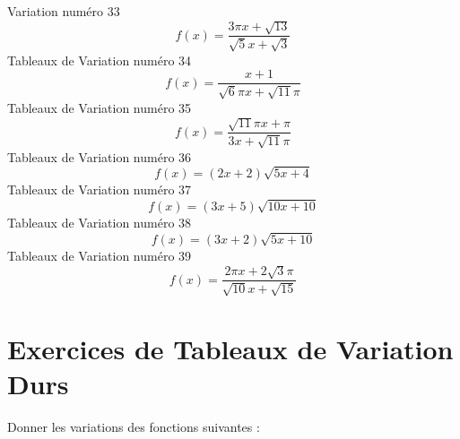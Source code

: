 \documentclass{article}
\begin{document}
Variation num\'ero 33 \[f(x) = \frac{3 \pi x + \sqrt{13}}{\sqrt{5} x + \sqrt{3}}\]Tableaux de Variation num\'ero 34 \[f(x) = \frac{x + 1}{\sqrt{6} \pi x + \sqrt{11} \pi}\]Tableaux de Variation num\'ero 35 \[f(x) = \frac{\sqrt{11} \pi x + \pi}{3 x + \sqrt{11} \pi}\]Tableaux de Variation num\'ero 36 \[f(x) = \left(2 x + 2\right) \sqrt{5 x + 4}\]Tableaux de Variation num\'ero 37 \[f(x) = \left(3 x + 5\right) \sqrt{10 x + 10}\]Tableaux de Variation num\'ero 38 \[f(x) = \left(3 x + 2\right) \sqrt{5 x + 10}\]Tableaux de Variation num\'ero 39 \[f(x) = \frac{2 \pi x + 2 \sqrt{3} \pi}{\sqrt{10} x + \sqrt{15}}\]
 \section{Exercices de Tableaux de Variation Durs}

 Donner les variations des fonctions suivantes : 
\end{document}
